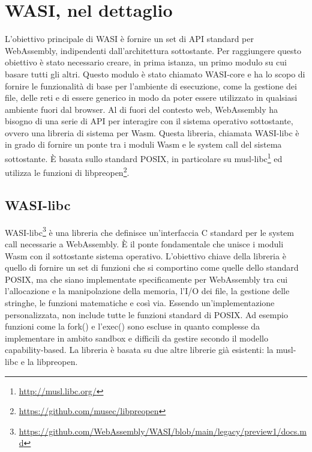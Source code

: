 \chapter{WASI, nel dettaglio}
\label{chap:wasi-in-depth}
L'obiettivo principale di WASI è fornire un set di API standard per WebAssembly, indipendenti dall'architettura
sottostante. Per raggiungere questo obiettivo è stato necessario creare, in prima istanza, un primo modulo su cui basare
tutti gli altri. Questo modulo è stato chiamato WASI-core e ha lo scopo di fornire le funzionalità di base per
l'ambiente di esecuzione, come la gestione dei file, delle reti e di essere generico in modo da poter essere utilizzato
in qualsiasi ambiente fuori dal browser. Al di fuori del contesto web, WebAssembly ha bisogno di una serie di API per
interagire con il sistema operativo sottostante, ovvero una libreria di sistema per Wasm. Questa libreria, chiamata
WASI-libc è in grado di fornire un ponte tra i moduli Wasm e le system call del sistema sottostante. È basata sullo
standard POSIX\cite{posix-standard}, in particolare su musl-libc\footnote{\url{http://musl.libc.org/}} ed utilizza le
funzioni di libpreopen\footnote{\url{https://github.com/musec/libpreopen}}.

\section{WASI-libc}
WASI-libc\footnote{\url{https://github.com/WebAssembly/WASI/blob/main/legacy/preview1/docs.md}} è una libreria che
definisce un'interfaccia C standard per le system call necessarie a WebAssembly. È il ponte fondamentale che unisce i
moduli Wasm con il sottostante sistema operativo. L'obiettivo chiave della libreria è quello di fornire un set di
funzioni che si comportino come quelle dello standard POSIX, ma che siano implementate specificamente per WebAssembly
tra cui l'allocazione e la manipolazione della memoria, l'I/O dei file, la gestione delle stringhe, le funzioni
matematiche e così via. Essendo un'implementazione personalizzata, non include tutte le funzioni standard di POSIX. Ad
esempio funzioni come la fork() e l'exec() sono escluse in quanto complesse da implementare in ambito sandbox e
difficili da gestire secondo il modello capability-based. La libreria è basata su due altre librerie già esistenti: la
musl-libc e la libpreopen.
